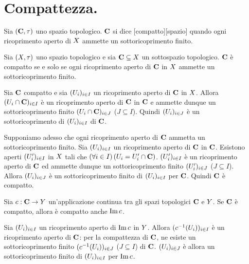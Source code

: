 \section{Compattezza.}\label{Compattezza}
\begin{Definition}
	Sia $(\mathbf{C},\tau)$ uno spazio topologico.
	$\mathbf{C}$ si dice [compatto][spazio]
	quando ogni ricoprimento aperto di $X$ ammette un
	sottoricoprimento finito.
\end{Definition}
\begin{Theorem}
	Sia $(X,\tau)$ uno spazio topologico e sia $\mathbf{C} \subseteq X$ un sottospazio topologico. $\mathbf{C}$ \`e compatto se e solo se ogni ricoprimento aperto di $\mathbf{C}$ in $X$ ammette un sottoricoprimento finito.
\end{Theorem}
\Proof Sia $\mathbf{C}$ compatto e sia $(U_i)_{i \in I}$ un ricoprimento aperto di $\mathbf{C}$ in $X$. Allora $(U_i \cap \mathbf{C})_{i \in I}$ \`e un ricoprimento aperto di $\mathbf{C}$ in $\mathbf{C}$ e ammette dunque un sottoricoprimento finito $(U_i \cap \mathbf{C})_{i \in J}$ ($J \subseteq I$). Quindi $(U_i)_{i \in J}$ \`e un sottoricoprimento di $(U_i)_{i \in I}$ di $\mathbf{C}$.
\par Supponiamo adesso che ogni ricoprimento aperto di $\mathbf{C}$ ammetta un sottoricoprimento finito. Sia $(U_i)_{i \in I}$ un ricoprimento aperto di $\mathbf{C}$ in $\mathbf{C}$. Esistono aperti $(U_i')_{i \in I}$ in $X$ tali che $\left ( \forall i \in I \right ) \left ( U_i = U_i' \cap \mathbf{C} \right )$. $(U_i')_{i \in I}$ \`e un ricoprimento aperto di $\mathbf{C}$ ed ammette dunque un sottoricoprimento finito $(U_i')_{i \in J}$ ($J \subseteq I$). Allora $(U_i)_{i \in J}$ \`e un sottoricoprimento finito di $(U_i)_{i \in I}$ per $\mathbf{C}$. Quindi $\mathbf{C}$ \`e compatto. \EndProof
\begin{Theorem}
	Sia $c: \mathbf{C} \rightarrow Y$ un'applicazione continua tra gli spazi topologici $\mathbf{C}$ e $Y$. Se $\mathbf{C}$ \`e compatto, allora \`e compatto anche $\operatorname{Im}{c}$.
\end{Theorem}
\Proof Sia $(U_i)_{i \in I}$ un ricoprimento aperto di $\operatorname{Im}{c}$ in $Y$. Allora $(c^{-1}(U_i))_{i \in I}$ \`e un ricoprimento aperto di $\mathbf{C}$: per la compattezza di $\mathbf{C}$, ne esiste un sottoricoprimento finito $(c^{-1}(U_i))_{i \in J}$ ($J \subseteq I$) di $\mathbf{C}$. $(U_i)_{i \in J}$ \`e allora un sottoricoprimento finito di $(U_i)_{i \in I}$ per $\operatorname{Im}{c}$. \EndProof
